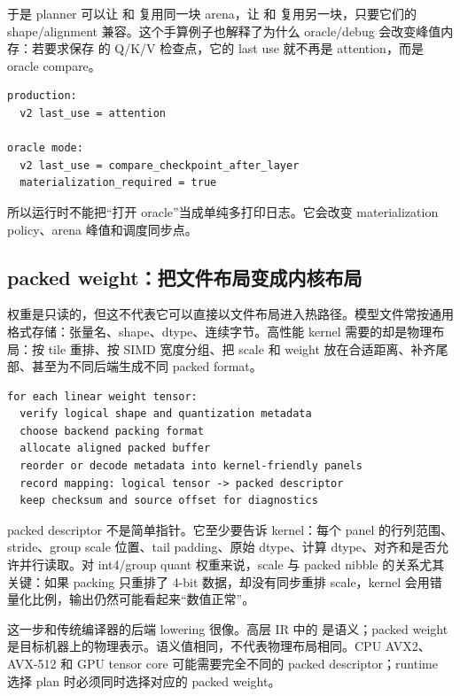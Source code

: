 于是 planner 可以让  和  复用同一块 arena，让  和  复用另一块，只要它们的 shape/alignment 兼容。这个手算例子也解释了为什么 oracle/debug 会改变峰值内存：若要求保存  的 Q/K/V 检查点，它的 last use 就不再是 attention，而是 oracle compare。

\begin{lstlisting}[numbers=none,caption={debug policy 对生命周期的影响}]
production:
  v2 last_use = attention

oracle mode:
  v2 last_use = compare_checkpoint_after_layer
  materialization_required = true
\end{lstlisting}

所以运行时不能把“打开 oracle”当成单纯多打印日志。它会改变 materialization policy、arena 峰值和调度同步点。

\subsection{packed weight：把文件布局变成内核布局}

权重是只读的，但这不代表它可以直接以文件布局进入热路径。模型文件常按通用格式存储：张量名、shape、dtype、连续字节。高性能 kernel 需要的却是物理布局：按 tile 重排、按 SIMD 宽度分组、把 scale 和 weight 放在合适距离、补齐尾部、甚至为不同后端生成不同 packed format。

\begin{lstlisting}[numbers=none,caption={从 manifest 到 packed weight 的准备过程}]
for each linear weight tensor:
  verify logical shape and quantization metadata
  choose backend packing format
  allocate aligned packed buffer
  reorder or decode metadata into kernel-friendly panels
  record mapping: logical tensor -> packed descriptor
  keep checksum and source offset for diagnostics
\end{lstlisting}

packed descriptor 不是简单指针。它至少要告诉 kernel：每个 panel 的行列范围、stride、group scale 位置、tail padding、原始 dtype、计算 dtype、对齐和是否允许并行读取。对 int4/group quant 权重来说，scale 与 packed nibble 的关系尤其关键：如果 packing 只重排了 4-bit 数据，却没有同步重排 scale，kernel 会用错量化比例，输出仍然可能看起来“数值正常”。

这一步和传统编译器的后端 lowering 很像。高层 IR 中的  是语义；packed weight 是目标机器上的物理表示。语义值相同，不代表物理布局相同。CPU AVX2、AVX-512 和 GPU tensor core 可能需要完全不同的 packed descriptor；runtime 选择 plan 时必须同时选择对应的 packed weight。

